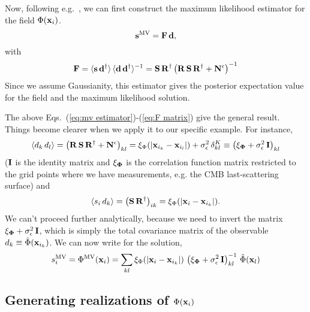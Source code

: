 \documentclass[prd, onecolumn, nofootinbib, floatfix]{revtex4-1}
\newcommand{\be}{\begin{equation}}
\newcommand{\ee}{\end{equation}}
\begin{document}
Now, following e.g.~\cite{rp92,zaroubietal95}, we can first construct the maximum likelihood estimator
for the field $\Phi({\bf x}_i)$.
\be
\label{eq:mv estimator}
{\bf s}^{\rm MV} = {\bf F} \, {\bf d},
\ee
with
\be
\label{eq:F matrix}
{\bf F} = \langle {\bf s} \, {\bf d}^\dagger \rangle \, \langle {\bf d} \, {\bf d}^\dagger \rangle^{-1} = {\bf S} \, {\bf R}^\dagger \left( {\bf R} \, {\bf S} \, {\bf R}^\dagger + {\bf N^\epsilon}  \right)^{-1}
\ee
Since we assume Gaussianity, this estimator gives the posterior expectation value for the field
and the maximum likelihood solution.

The above Eqs.~(\ref{eq:mv estimator})-(\ref{eq:F matrix}) give the general result. Things become clearer when we apply it to our specific example.
For instance,
\be
\langle d_k \, d_l \rangle = \left({\bf R} \, {\bf S} \, {\bf R}^\dagger  + {\bf N^\epsilon} \right)_{kl} = \xi_\Phi(|{\bf x}_{i_k} - {\bf x}_{i_l}|) + \sigma_{\epsilon}^2 \, \delta^K_{kl} \equiv \left({\bf \xi_\Phi} + \sigma^2_\epsilon \, {\bf I}\right)_{kl}
\ee
(${\bf I}$ is the identity matrix and ${\bf \xi_\Phi}$ is the correlation function matrix restricted to the grid points
where we have measurements, e.g. the CMB last-scattering surface) and
\be
\langle s_i \, d_k \rangle = \left( {\bf S} \, {\bf R}^\dagger \right)_{i k} = \xi_\Phi(|{\bf x}_{i} - {\bf x}_{i_k}|).
\ee
We can't proceed further analytically, because we need to invert the matrix ${\bf \xi_\Phi} + \sigma^2_\epsilon \, {\bf I}$,
which is simply the total covariance matrix of the observable $d_k \equiv \hat{\Phi}({\bf x}_{i_k})$.
We can now write for the solution,
\be
\label{eq:mv sol}
s^{\rm MV}_i = \Phi^{\rm MV}({\bf x}_i) = \sum_{kl}  \xi_\Phi(|{\bf x}_{i} - {\bf x}_{i_k}|) \, \left({\bf \xi_\Phi} + \sigma^2_\epsilon \, {\bf I}\right)^{-1}_{kl} \, \hat{\Phi}({\bf x}_l)
\ee








\subsection{Generating realizations of $\Phi({\bf x}_i)$}
\end{document}
